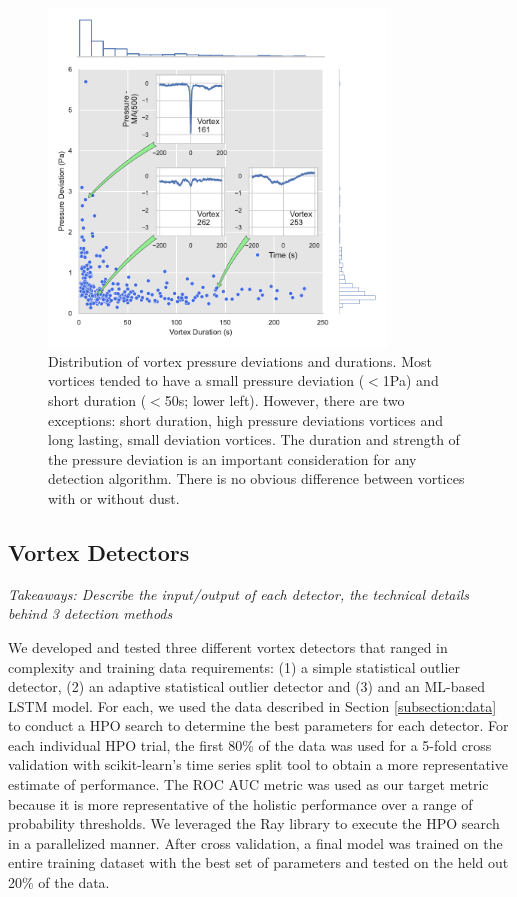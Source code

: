 \begin{figure}
    \centering
    \includegraphics[width=0.8\textwidth]
    {figures/manuscript_vortex_dur_pres_dists_v4.pdf}
    \caption{Distribution of vortex pressure deviations and durations. Most vortices tended to have a small pressure deviation ($<$1Pa) and short duration ($<$50s; lower left). However, there are two exceptions: short duration, high pressure deviations vortices and long lasting, small deviation vortices. The duration and strength of the pressure deviation is an important consideration for any detection algorithm. There is no obvious difference between vortices with or without dust.}
    \label{fig:vortex_dur_pres_dists}
\end{figure}

\subsection{Vortex Detectors}\label{subsection: vortex_detectors}
\textit{Takeaways: Describe the input/output of each detector, the technical details behind 3 detection methods}

We developed and tested three different vortex detectors that ranged in complexity and training data requirements: (1) a simple statistical outlier detector, (2) an adaptive statistical outlier detector and (3) and an \acrshort{ML}-based \acrfull{LSTM} model. 
For each, we used the data described in Section \ref{subsection:data} to conduct a \acrfull{HPO} search to determine the best parameters for each detector. 
For each individual \acrshort{HPO} trial, the first 80\% of the data was used for a 5-fold cross validation with scikit-learn’s time series split tool to obtain a more representative estimate of performance. 
The \acrfull{ROC AUC} metric was used as our target metric because it is more representative of the holistic performance over a range of probability thresholds. 
We leveraged the Ray library to execute the \acrshort{HPO} search in a parallelized manner. 
After cross validation, a final model was trained on the entire training dataset with the best set of parameters and tested on the held out 20\% of the data. 

